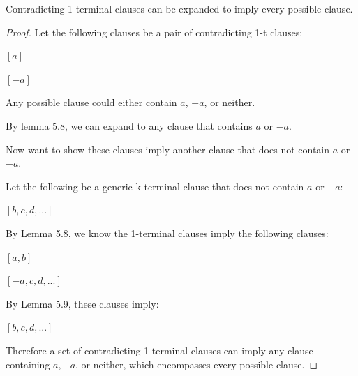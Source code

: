 \documentclass[manuscript]{acmart}
\begin{document}
    \begin{lemma}
        Contradicting 1-terminal clauses can be expanded to imply every possible clause.
    \end{lemma}
    \begin{proof}
        Let the following clauses be a pair of contradicting 1-t clauses:

        $[a]$

        $[-a]$

        Any possible clause could either contain $a$, $-a$, or neither.

        By lemma 5.8, we can expand to any clause that contains $a$ or $-a$.

        Now want to show these clauses imply another clause that does not contain  $a$ or $-a$.

        Let the following be a generic k-terminal clause that does not contain $a$ or $-a$:

        $[b, c, d, ...]$

        By Lemma 5.8, we know the 1-terminal clauses imply the following clauses:

        $[a, b]$

        $[-a, c, d, ...]$

        By Lemma 5.9, these clauses imply:

        $[b, c, d, ...]$

        Therefore a set of contradicting 1-terminal clauses can imply any clause containing $a, -a$, or neither, which encompasses every possible clause.
    \end{proof}
\end{document}
